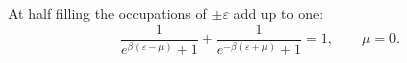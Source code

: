 \documentclass{article}
\begin{document}
At half filling the occupations of $\pm\varepsilon$ add up to one:
\begin{equation}
\frac{1}{e^{\beta(\varepsilon-\mu)}+1} + \frac{1}{e^{-\beta(\varepsilon+\mu)}+1} = 1, \qquad \mu = 0 .
\label{eq:ph}
\end{equation}
\end{document}
